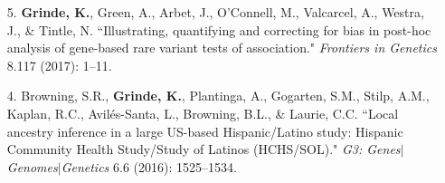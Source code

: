 \documentclass[margin]{res}
\begin{document}
\begin{resume}
\begin{itemize}
\item[5.] \textbf{Grinde, K.}, Green, A., Arbet, J., O'Connell, M., Valcarcel, A., Westra, J., \& Tintle, N. ``Illustrating, quantifying and correcting for bias in post-hoc analysis of gene-based rare variant tests of association." \textit{Frontiers in Genetics} 8.117 (2017): 1--11. 
	
\item[4.] Browning, S.R., \textbf{Grinde, K.}, Plantinga, A., Gogarten, S.M., Stilp, A.M., Kaplan, R.C., Avil\'es-Santa, L., Browning, B.L., \& Laurie, C.C. ``Local ancestry inference in a large US-based Hispanic/Latino study: Hispanic Community Health Study/Study of Latinos (HCHS/SOL)." \textit{G3: Genes}$|$\textit{Genomes}$|$\textit{Genetics} 6.6 (2016): 1525--1534.
	

\end{itemize}
\end{resume}
\end{document}
